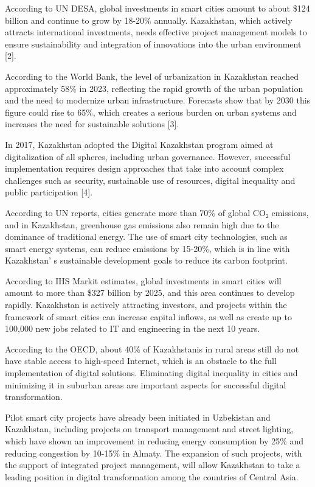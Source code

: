 {According to UN DESA, global investments in smart cities amount to about
\$124 billion and continue to grow by 18-20\% annually. Kazakhstan,
which actively attracts international investments, needs effective
project management models to ensure sustainability and integration of
innovations into the urban environment {[}2{]}.

According to the World Bank, the level of urbanization in Kazakhstan
reached approximately 58\% in 2023, reflecting the rapid growth of the
urban population and the need to modernize urban infrastructure.
Forecasts show that by 2030 this figure could rise to 65\%, which
creates a serious burden on urban systems and increases the need for
sustainable solutions {[}3{]}.

In 2017, Kazakhstan adopted the Digital Kazakhstan program aimed at
digitalization of all spheres, including urban governance. However,
successful implementation requires design approaches that take into
account complex challenges such as security, sustainable use of
resources, digital inequality and public participation {[}4{]}.

According to UN reports, cities generate more than 70\% of global CO₂
emissions, and in Kazakhstan, greenhouse gas emissions also remain high
due to the dominance of traditional energy. The use of smart city
technologies, such as smart energy systems, can reduce emissions by
15-20\%, which is in line with Kazakhstan' s sustainable
development goals to reduce its carbon footprint.

According to IHS Markit estimates, global investments in smart cities
will amount to more than \$327 billion by 2025, and this area continues
to develop rapidly. Kazakhstan is actively attracting investors, and
projects within the framework of smart cities can increase capital
inflows, as well as create up to 100,000 new jobs related to IT and
engineering in the next 10 years.

According to the OECD, about 40\% of Kazakhstanis in rural areas still
do not have stable access to high-speed Internet, which is an obstacle
to the full implementation of digital solutions. Eliminating digital
inequality in cities and minimizing it in suburban areas are important
aspects for successful digital transformation.

Pilot smart city projects have already been initiated in Uzbekistan and
Kazakhstan, including projects on transport management and street
lighting, which have shown an improvement in reducing energy consumption
by 25\% and reducing congestion by 10-15\% in Almaty. The expansion of
such projects, with the support of integrated project management, will
allow Kazakhstan to take a leading position in digital transformation
among the countries of Central Asia.

}
